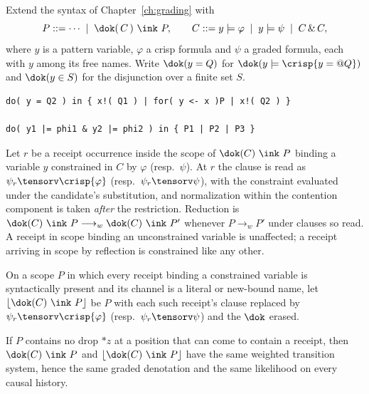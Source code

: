 \begin{definition}
\label{do:def:do}
Extend the syntax of Chapter~\ref{ch:grading} with
\[
  P ::= \cdots \;\mid\; \dok(\,C\,)\ \ink\ P, \qquad
  C ::= y \models \varphi \;\mid\; y \models \psi \;\mid\; C \,\&\, C ,
\]
where $y$ is a pattern variable, $\varphi$ a crisp formula and $\psi$ a graded formula, each with
$y$ among its free names. Write $\dok(y = Q)$ for $\dok(y \models \crisp{y = @Q})$ and
$\dok(y \in S)$ for the disjunction over a finite set $S$.
\end{definition}

\begin{lstlisting}
do( y = Q2 ) in { x!( Q1 ) | for( y <- x )P | x!( Q2 ) }

do( y1 |= phi1 & y2 |= phi2 ) in { P1 | P2 | P3 }
\end{lstlisting}

\begin{definition}
\label{do:def:membrane}
Let $r$ be a receipt occurrence inside the scope of $\dok(C)\ \ink\ P$ binding a variable $y$
constrained in $C$ by $\varphi$ (resp.\ $\psi$). At $r$ the clause is read as
$\psi_r \tensorv \crisp{\varphi}$ (resp.\ $\psi_r \tensorv \psi$), with the constraint evaluated
under the candidate's substitution, and normalization within the contention component is taken
\emph{after} the restriction. Reduction is $\dok(C)\ \ink\ P \longrightarrow_w \dok(C)\ \ink\ P'$
whenever $P \longrightarrow_w P'$ under clauses so read. A receipt in scope binding an unconstrained
variable is unaffected; a receipt arriving in scope by reflection is constrained like any other.
\end{definition}

\begin{definition}[Lowering]
\label{do:def:lowering}
On a scope $P$ in which every receipt binding a constrained variable is syntactically present and
its channel is a literal or \textsf{new}-bound name, let $\lfloor \dok(C)\ \ink\ P \rfloor$ be $P$
with each such receipt's clause replaced by $\psi_r \tensorv \crisp{\varphi}$ (resp.\
$\psi_r \tensorv \psi$) and the $\dok$ erased.
\end{definition}

\begin{proposition}
\label{do:prop:lowering}
If $P$ contains no drop $*z$ at a position that can come to contain a receipt, then
$\dok(C)\ \ink\ P$ and $\lfloor \dok(C)\ \ink\ P \rfloor$ have the same weighted transition system,
hence the same graded denotation and the same likelihood on every causal history.
\end{proposition}

